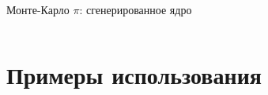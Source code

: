 \documentclass[@BEAMER_OPTIONS@]{beamer}
\begin{document}
\begin{frame}[fragile]{Монте-Карло $\pi$: сгенерированное ядро}
\begin{columns}
\begin{column}[t]{0.3\textwidth}
\begin{exampleblock}{}
                \begin{adjustbox}{width=0.23\textwidth, height=\textheight, keepaspectratio}
                    \begin{minipage}{\textwidth}
                        
                        \vspace{\baselineskip}
                    \end{minipage}
                \end{adjustbox}
            \end{exampleblock}
        \end{column}
    \end{columns}
\end{frame}

\section{Примеры использования}

\begin{frame}
    \sectionpage
\end{frame}
\end{document}

